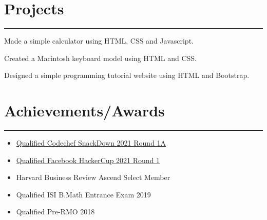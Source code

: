 \documentclass[]{debjitpal-resume}
\begin{document}
\begin{minipage}[t]{0.6\textwidth}
\section{Projects}
\noindent\rule{12.5cm}{0.4pt}
 
\noindent
\hspace{4em}%
\begin{minipage}{0.85\textwidth\vspace{5pt}}
Made a simple calculator using HTML, CSS and Javascript.
\end{minipage}
 
\noindent
\hspace{4em}%
\begin{minipage}{0.85\textwidth\vspace{5pt}}
Created a Macintosh keyboard model using HTML and CSS.
\end{minipage}
 
\noindent
\hspace{4em}%
\begin{minipage}{0.85\textwidth\vspace{5pt}}
Designed a simple programming tutorial website using HTML and Bootstrap.
\end{minipage}
\section{Achievements/Awards} 
\noindent\rule{12.5cm}{0.4pt}
\begin{itemize}
  \item \href{https://drive.google.com/file/d/1-0QWUmpZN7C7IGu7rhQgXSEN-h2_1IYc/view?usp=sharing}{Qualified Codechef SnackDown 2021 Round 1A}
  \item \href{https://drive.google.com/file/d/1-0W_lI_ffQuWv2Uz8gHq8oKya2hHcKIh/view?usp=sharing}{Qualified Facebook HackerCup 2021 Round 1}
  \item Harvard Business Review Ascend Select Member
  \item Qualified ISI B.Math Entrance Exam 2019
  \item Qualified Pre-RMO 2018
\end{itemize}

\end{minipage} 
\end{document}
